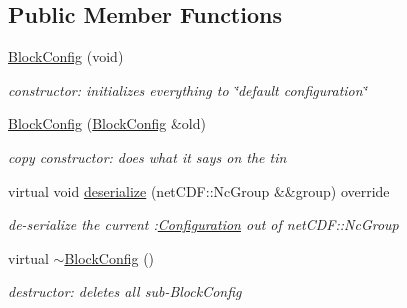 \subsection*{Public Member Functions}
\begin{DoxyCompactItemize}
\item 
\mbox{\label{class_s_m_spp__di__unipi__it_1_1_block_config_a21b671a1dba5dcff43346c58b6fbc171}} 
\mbox{\hyperlink{class_s_m_spp__di__unipi__it_1_1_block_config_a21b671a1dba5dcff43346c58b6fbc171}{Block\+Config}} (void)
\begin{DoxyCompactList}\small\item\em constructor\+: initializes everything to \char`\"{}default configuration\char`\"{} \end{DoxyCompactList}\item 
\mbox{\label{class_s_m_spp__di__unipi__it_1_1_block_config_a863554e8acfa4a30e8dec3f213821fa8}} 
\mbox{\hyperlink{class_s_m_spp__di__unipi__it_1_1_block_config_a863554e8acfa4a30e8dec3f213821fa8}{Block\+Config}} (\mbox{\hyperlink{class_s_m_spp__di__unipi__it_1_1_block_config}{Block\+Config}} \&old)
\begin{DoxyCompactList}\small\item\em copy constructor\+: does what it says on the tin \end{DoxyCompactList}\item 
virtual void \mbox{\hyperlink{class_s_m_spp__di__unipi__it_1_1_block_config_a828ece608e8a4a497f43d3d6bb75af40}{deserialize}} (net\+C\+D\+F\+::\+Nc\+Group \&\&group) override
\begin{DoxyCompactList}\small\item\em de-\/serialize the current \+:\mbox{\hyperlink{class_s_m_spp__di__unipi__it_1_1_configuration}{Configuration}} out of net\+C\+D\+F\+::\+Nc\+Group \end{DoxyCompactList}\item 
\mbox{\label{class_s_m_spp__di__unipi__it_1_1_block_config_aec5341a3f7c4f413013834b2f0e2b19e}} 
virtual \mbox{\hyperlink{class_s_m_spp__di__unipi__it_1_1_block_config_aec5341a3f7c4f413013834b2f0e2b19e}{$\sim$\+Block\+Config}} ()
\begin{DoxyCompactList}\small\item\em destructor\+: deletes all sub-\/\+Block\+Config \end{DoxyCompactList}\item 

\end{DoxyCompactItemize}

